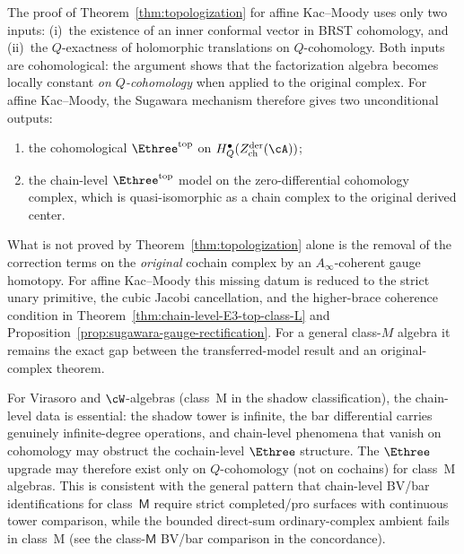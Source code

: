 \begin{remark}
\label{rem:topologization-chain-obstructions}
The proof of Theorem~\ref{thm:topologization} for affine
Kac--Moody uses only two inputs: (i)~the existence of an
inner conformal vector in BRST cohomology, and (ii)~the
$Q$-exactness of holomorphic translations on $Q$-cohomology.
Both inputs are cohomological: the argument shows that the
factorization algebra becomes locally constant
\emph{on $Q$-cohomology} when applied to the original
complex. For affine Kac--Moody, the Sugawara mechanism
therefore gives two unconditional outputs:
\begin{enumerate}[label=\textup{(\roman*)}]
\item the cohomological $\Ethree^{\mathrm{top}}$ on
 $H_Q^\bullet(Z^{\mathrm{der}}_{\mathrm{ch}}(\cA))$;
\item the chain-level $\Ethree^{\mathrm{top}}$ model on the
 zero-differential cohomology complex, which is
 quasi-isomorphic as a chain complex to the original
 derived center.
\end{enumerate}
What is not proved by Theorem~\ref{thm:topologization} alone is
the removal of the correction terms on the \emph{original}
cochain complex by an $A_\infty$-coherent gauge homotopy.
For affine Kac--Moody this missing datum is reduced to the
strict unary primitive, the cubic Jacobi cancellation, and the
higher-brace coherence condition in
Theorem~\ref{thm:chain-level-E3-top-class-L} and
Proposition~\ref{prop:sugawara-gauge-rectification}. For a
general class-$M$ algebra it remains the exact gap between
the transferred-model result and an original-complex theorem.

For Virasoro and $\cW$-algebras (class~M in the shadow
classification), the chain-level data is essential:
the shadow tower is infinite, the bar differential
carries genuinely infinite-degree operations, and
chain-level phenomena that vanish on cohomology may
obstruct the cochain-level $\Ethree$ structure. The
$\Ethree$ upgrade may therefore exist only on
$Q$-cohomology (not on cochains) for class~M algebras.
This is consistent with the general pattern that
chain-level BV/bar identifications for class~$\mathsf{M}$ require
strict completed/pro surfaces with continuous tower comparison,
while the bounded direct-sum ordinary-complex ambient fails in
class~M
\textup{(}see the class-$\mathsf M$ BV/bar comparison in the
concordance\textup{)}.


\end{remark}
